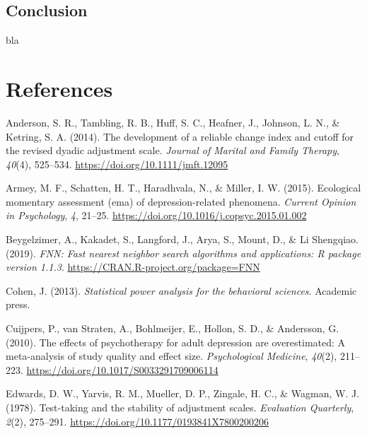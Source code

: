 \documentclass[12pt,twoside]{reedthesis}
\begin{document}
\hypertarget{conclusion}{%
\section{Conclusion}\label{conclusion}}

bla

\backmatter

\hypertarget{references}{%
\chapter{References}\label{references}}


\noindent

\setlength{\parindent}{-0.20in}
\setlength{\leftskip}{0.20in}
\setlength{\parskip}{8pt}

\hypertarget{refs}{}
\leavevmode\hypertarget{ref-Anderson.2014}{}%
Anderson, S. R., Tambling, R. B., Huff, S. C., Heafner, J., Johnson, L. N., \& Ketring, S. A. (2014). The development of a reliable change index and cutoff for the revised dyadic adjustment scale. \emph{Journal of Marital and Family Therapy}, \emph{40}(4), 525--534. \url{https://doi.org/10.1111/jmft.12095}

\leavevmode\hypertarget{ref-Armey.2015}{}%
Armey, M. F., Schatten, H. T., Haradhvala, N., \& Miller, I. W. (2015). Ecological momentary assessment (ema) of depression-related phenomena. \emph{Current Opinion in Psychology}, \emph{4}, 21--25. \url{https://doi.org/10.1016/j.copsyc.2015.01.002}

\leavevmode\hypertarget{ref-Beygelzimer.2019}{}%
Beygelzimer, A., Kakadet, S., Langford, J., Arya, S., Mount, D., \& Li Shengqiao. (2019). \emph{FNN: Fast nearest neighbor search algorithms and applications: R package version 1.1.3}. \url{https://CRAN.R-project.org/package=FNN}

\leavevmode\hypertarget{ref-Cohen.2013}{}%
Cohen, J. (2013). \emph{Statistical power analysis for the behavioral sciences}. Academic press.

\leavevmode\hypertarget{ref-Cuijpers.2010}{}%
Cuijpers, P., van Straten, A., Bohlmeijer, E., Hollon, S. D., \& Andersson, G. (2010). The effects of psychotherapy for adult depression are overestimated: A meta-analysis of study quality and effect size. \emph{Psychological Medicine}, \emph{40}(2), 211--223. \url{https://doi.org/10.1017/S0033291709006114}

\leavevmode\hypertarget{ref-Edwards.1978}{}%
Edwards, D. W., Yarvis, R. M., Mueller, D. P., Zingale, H. C., \& Wagman, W. J. (1978). Test-taking and the stability of adjustment scales. \emph{Evaluation Quarterly}, \emph{2}(2), 275--291. \url{https://doi.org/10.1177/0193841X7800200206}
\end{document}
